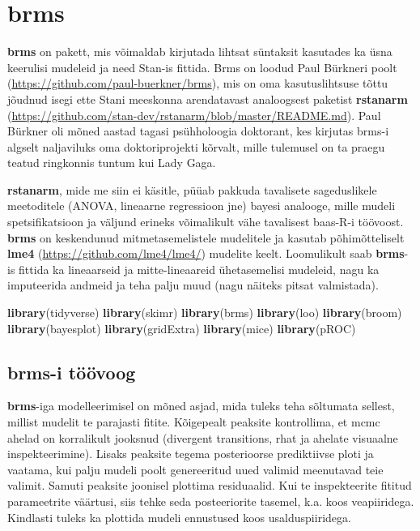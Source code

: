 \documentclass[]{article}
\title{}
\author{}
\date{}
\newenvironment{Shaded}{\begin{snugshade}}{\end{snugshade}}
\newcommand{\KeywordTok}[1]{\textcolor[rgb]{0.13,0.29,0.53}{\textbf{#1}}}
\newcommand{\NormalTok}[1]{#1}
\begin{document}
\section{brms}\label{brms}

\textbf{brms} on pakett, mis võimaldab kirjutada lihtsat süntaksit
kasutades ka üsna keerulisi mudeleid ja need Stan-is fittida. Brms on
loodud Paul Bürkneri poolt
(\url{https://github.com/paul-buerkner/brms}), mis on oma
kasutuslihtsuse tõttu jõudnud isegi ette Stani meeskonna arendatavast
analoogsest paketist \textbf{rstanarm}
(\url{https://github.com/stan-dev/rstanarm/blob/master/README.md}). Paul
Bürkner oli mõned aastad tagasi psühholoogia doktorant, kes kirjutas
brms-i algselt naljaviluks oma doktoriprojekti kõrvalt, mille tulemusel
on ta praegu teatud ringkonnis tuntum kui Lady Gaga.

\textbf{rstanarm}, mide me siin ei käsitle, püüab pakkuda tavalisete
sageduslikele meetoditele (ANOVA, lineaarne regressioon jne) bayesi
analooge, mille mudeli spetsifikatsioon ja väljund erineks võimalikult
vähe tavalisest baas-R-i töövoost. \textbf{brms} on keskendunud
mitmetasemelistele mudelitele ja kasutab põhimõtteliselt \textbf{lme4}
(\url{https://github.com/lme4/lme4/}) mudelite keelt. Loomulikult saab
\textbf{brms}-is fittida ka lineaarseid ja mitte-lineaareid
ühetasemelisi mudeleid, nagu ka imputeerida andmeid ja teha palju muud
(nagu näiteks pitsat valmistada).

\begin{Shaded}
\begin{Highlighting}[]
\KeywordTok{library}\NormalTok{(tidyverse)}
\KeywordTok{library}\NormalTok{(skimr)}
\KeywordTok{library}\NormalTok{(brms)}
\KeywordTok{library}\NormalTok{(loo)}
\KeywordTok{library}\NormalTok{(broom)}
\KeywordTok{library}\NormalTok{(bayesplot)}
\KeywordTok{library}\NormalTok{(gridExtra)}
\KeywordTok{library}\NormalTok{(mice)}
\KeywordTok{library}\NormalTok{(pROC)}
\end{Highlighting}
\end{Shaded}

\subsection{brms-i töövoog}\label{brms-i-toovoog}

\textbf{brms}-iga modelleerimisel on mõned asjad, mida tuleks teha
sõltumata sellest, millist mudelit te parajasti fitite. Kõigepealt
peaksite kontrollima, et mcmc ahelad on korralikult jooksnud (divergent
transitions, rhat ja ahelate visuaalne inspekteerimine). Lisaks peaksite
tegema posterioorse prediktiivse ploti ja vaatama, kui palju mudeli
poolt genereeritud uued valimid meenutavad teie valimit. Samuti peaksite
joonisel plottima residuaalid. Kui te inspekteerite fititud parameetrite
väärtusi, siis tehke seda posteeriorite tasemel, k.a. koos veapiiridega.
Kindlasti tuleks ka plottida mudeli ennustused koos usalduspiiridega.
\end{document}
